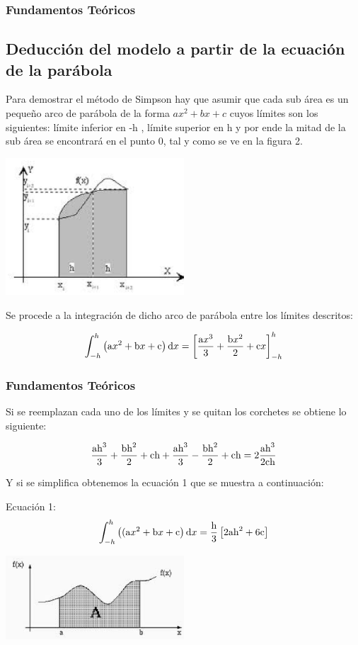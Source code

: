 \documentclass{beamer}
\begin{document}
\begin{frame}
\frametitle{Fundamentos Teóricos}
\subsection{Deducción del modelo a partir de la ecuación de la parábola}
Para demostrar el método de Simpson hay que asumir que cada sub área es un pequeño arco de parábola de la forma $ ax^2 + bx + c $ cuyos límites son los siguientes: límite inferior en -h , límite superior en h y por ende la mitad de la sub área se encontrará en el punto 0, tal y como se ve en la figura 2.
	
\begin{center}
\includegraphics[width=0.5\textwidth]{img/ima2.eps}
\end{center}	
	
		Se procede a la integración de dicho arco de parábola entre los límites descritos:
		
		\[ \int_{-h}^{h}\left(\textup{a}x^2 + \textup{b}x + \textup{c}\right)\textup{d}x=\left[\frac{\textup{a}x^{3}}
		{3}+\frac{\textup{b}x^{2}}{2}+\textup{c}x\right]_{-h}^{h} \] 
		
\end{frame}

\begin{frame}
\frametitle{Fundamentos Teóricos}	
		Si se reemplazan cada uno de los límites y se quitan los corchetes se obtiene lo siguiente:
		
		\[\frac{\textup{a}\textup{h}^3}{3} + \frac{\textup{b}\textup{h}^2}{2} + \textup{c}\textup{h} + \frac{\textup{a}\textup{h}^3}{3} 
		-  \frac{\textup{b}\textup{h}^2}{2} + \textup{c}\textup{h}=2\frac{\textup{a}\textup{h}^3}{2\textup{c}\textup{h}}\]
		
		Y si se simplifica obtenemos la ecuación 1 que se muestra a continuación:
		
		Ecuación 1: \[\int_{-h}^{h}\left((\textup{a}x^2 + \textup{b}x + \textup{c}\right)\textup{d}x=\frac{\textup{h}}
		{3}\left[2\textup{a}\textup{h}^2  +  6\textup{c}\right]\]
		
\begin{center}
\includegraphics[width=0.5\textwidth]{img/ima3.eps}
\end{center}
	
\end{frame}
\end{document}
